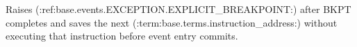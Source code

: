 Raises (:ref:base.events.EXCEPTION.EXPLICIT_BREAKPOINT:) after BKPT completes and saves the next (:term:base.terms.instruction_address:) without executing that instruction before event entry commits.
